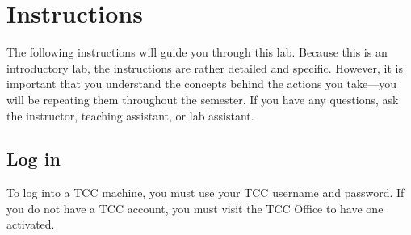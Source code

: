 \documentclass[12pt]{article}
\begin{document}


\section{Instructions}

The following instructions will guide you through this lab. Because this is an introductory lab, the instructions are rather detailed and specific. However, it is important that you understand the concepts behind the actions you take---you will be repeating them throughout the semester. If you have any questions, ask the instructor, teaching assistant, or lab assistant.

\subsection{Log in}
To log into a TCC machine, you must use your TCC username and password. If you do not have a TCC account, you must visit the TCC Office to have one activated.
\end{document}
